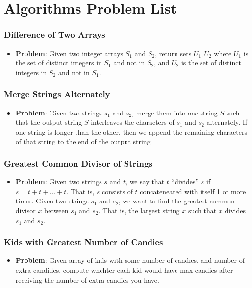 \documentclass[10pt,a4paper]{article}
\begin{document}
\section*{Algorithms Problem List}

\subsubsection*{Difference of Two Arrays}
\begin{itemize}
    \item \textbf{Problem}: Given two integer arrays $S_1$ and $S_2$, return sets $U_1,U_2$ where $U_1$ is the set of distinct integers in $S_1$ and not in $S_2$, and $U_2$ is the set of distinct integers in $S_2$ and not in $S_1$.
\end{itemize}

\subsubsection*{Merge Strings Alternately}
\begin{itemize}
    \item \textbf{Problem}: Given two strings $s_1$ and $s_2$, merge them into one string $S$ such that the output string $S$ interleaves the characters of $s_1$ and $s_2$ alternately. If one string is longer than the other, then we append the remaining characters of that string to the end of the output string.
\end{itemize}


\subsubsection*{Greatest Common Divisor of Strings}
\begin{itemize}
    \item \textbf{Problem}: Given two strings $s$ and $t$, we say that $t$ ``divides'' $s$ if $s = t + t + \dots + t$. That is, $s$ consists of $t$ concateneated with  itself 1 or more times. Given two strings $s_1$ and $s_2$, we want to find the greatest common divisor $x$ between $s_1$ and $s_2$. That is, the largest string $x$ such that $x$ divides $s_1$ and $s_2$.
\end{itemize}

\subsubsection*{Kids with Greatest Number of Candies}
\begin{itemize}
    \item \textbf{Problem}: Given array of kids with some number of candies, and number of extra candides, compute whehter each kid would have max candies after receiving the number of extra candies you have.
\end{itemize}
\end{document}
